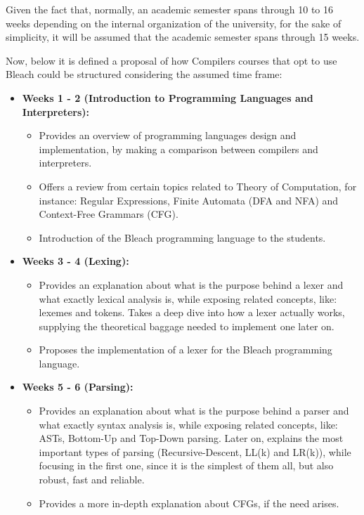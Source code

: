 Given the fact that, normally, an academic semester spans through 10 to 16 weeks depending on the internal organization of the university, for the sake of simplicity, it will be assumed that the academic semester spans through 15 weeks.

Now, below it is defined a proposal of how Compilers courses that opt to use Bleach could be structured considering the assumed time frame:
\begin{itemize}
    \item \textbf{Weeks 1 - 2 (Introduction to Programming Languages and Interpreters):}
        \begin{itemize}
            \item Provides an overview of programming languages design and implementation, by making a comparison between compilers and interpreters.
            \item Offers a review from certain topics related to Theory of Computation, for instance: Regular Expressions, Finite Automata (DFA and NFA) and Context-Free Grammars (CFG).
            \item Introduction of the Bleach programming language to the students.
        \end{itemize}
    
    \item \textbf{Weeks 3 - 4 (Lexing):}
        \begin{itemize}
            \item Provides an explanation about what is the purpose behind a lexer and what exactly lexical analysis is, while exposing related concepts, like: lexemes and tokens. Takes a deep dive into how a lexer actually works, supplying the theoretical baggage needed to implement one later on.
            \item Proposes the implementation of a lexer for the Bleach programming language. 
        \end{itemize}

    \newpage
    
    \item \textbf{Weeks 5 - 6 (Parsing):} 
        \begin{itemize}
            \item Provides an explanation about what is the purpose behind a parser and what exactly syntax analysis is, while exposing related concepts, like: ASTs, Bottom-Up and Top-Down parsing. Later on, explains the most important types of parsing (Recursive-Descent, LL(k) and LR(k)), while focusing in the first one, since it is the simplest of them all, but also robust, fast and reliable.
            \item Provides a more in-depth explanation about CFGs, if the need arises.
        \end{itemize}
    

\end{itemize}
